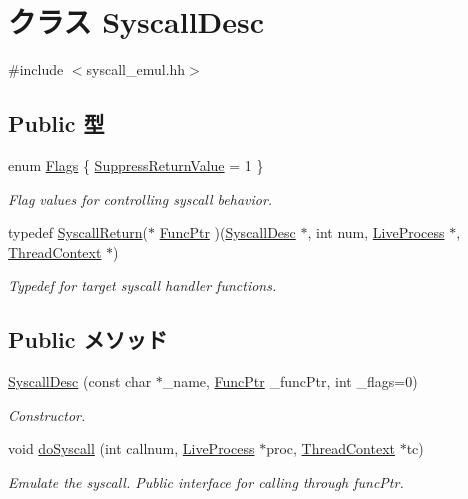 \hypertarget{classSyscallDesc}{
\section{クラス SyscallDesc}
\label{classSyscallDesc}
}


{\ttfamily \#include $<$syscall\_\-emul.hh$>$}\subsection*{Public 型}
\begin{DoxyCompactItemize}
\item 
enum \hyperlink{classSyscallDesc_aa705cf7e79a21c2352b00ffe20cd295f}{Flags} \{ \hyperlink{classSyscallDesc_aa705cf7e79a21c2352b00ffe20cd295fab4992a2474f4af8a3274d2024ab0530e}{SuppressReturnValue} =  1
 \}
\begin{DoxyCompactList}\small\item\em Flag values for controlling syscall behavior. \item\end{DoxyCompactList}\item 
typedef \hyperlink{classSyscallReturn}{SyscallReturn}($\ast$ \hyperlink{classSyscallDesc_a78a0bd5af3c5dd3fcd94f3d629b112ce}{FuncPtr} )(\hyperlink{classSyscallDesc}{SyscallDesc} $\ast$, int num, \hyperlink{classLiveProcess}{LiveProcess} $\ast$, \hyperlink{classThreadContext}{ThreadContext} $\ast$)
\begin{DoxyCompactList}\small\item\em Typedef for target syscall handler functions. \item\end{DoxyCompactList}\end{DoxyCompactItemize}
\subsection*{Public メソッド}
\begin{DoxyCompactItemize}
\item 
\hyperlink{classSyscallDesc_abb73d8c1b9785087f5fbf7f8b01c0663}{SyscallDesc} (const char $\ast$\_\-name, \hyperlink{classSyscallDesc_a78a0bd5af3c5dd3fcd94f3d629b112ce}{FuncPtr} \_\-funcPtr, int \_\-flags=0)
\begin{DoxyCompactList}\small\item\em Constructor. \item\end{DoxyCompactList}\item 
void \hyperlink{classSyscallDesc_a8a1b93297498c16444130f7ce9a12304}{doSyscall} (int callnum, \hyperlink{classLiveProcess}{LiveProcess} $\ast$proc, \hyperlink{classThreadContext}{ThreadContext} $\ast$tc)
\begin{DoxyCompactList}\small\item\em Emulate the syscall. Public interface for calling through funcPtr. \item\end{DoxyCompactList}\end{DoxyCompactItemize}
